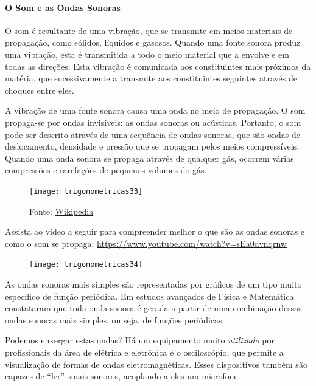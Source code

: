 \begin{knowledge}
\label{trig-knowledge1}
\vspace{-2\parskip}
\paragraph{O Som e as Ondas Sonoras}
O som é resultante de uma vibração, que se transmite em meios materiais de propagação, como sólidos, líquidos e gasosos.  Quando uma fonte sonora produz uma vibração, esta é transmitida a todo o meio material que a envolve e em todas as direções. Esta vibração é comunicada aos constituintes mais próximos da matéria, que sucessivamente a transmite aos constituintes seguintes através de choques entre eles.

A vibração de uma fonte sonora causa uma onda no meio de propagação. O som propaga-se por ondas invisíveis: as ondas sonoras ou acústicas. Portanto, o som pode ser descrito através de uma sequência de ondas sonoras, que são ondas de deslocamento, densidade e pressão que se propagam pelos meios compressíveis. Quando uma onda sonora se propaga através de qualquer gás, ocorrem várias compressões e rarefações de pequenos volumes do gás.

\begin{figure}[H]
\centering

\texttt{[image: trigonometricas33]}
\caption{Fonte: \href{https://pt.wikipedia.org/wiki/Som}{Wikipedia} }
\label{}
\end{figure}

Assista ao vídeo a seguir para compreender melhor o que são as ondas sonoras e como o som se propaga: \url{https://www.youtube.com/watch?v=sEa0dvnqrnw}

\begin{figure}[H]
\centering

\texttt{[image: trigonometricas34]}
\end{figure}

\needspace{5em}
As ondas sonoras mais simples são representadas por gráficos de um tipo muito específico de função periódica. Em estudos avançados de Física e Matemática constataram que toda onda sonora é gerada a partir de uma combinação dessas ondas sonoras mais simples, ou seja, de funções periódicas.

Podemos enxergar estas ondas? Há um equipamento muito \textit{utilizado} por profissionais da área de elétrica e eletrônica é o osciloscópio, que permite a visualização de formas de ondas eletromagnéticas. Esses dispositivos também são capazes de “ler”{} sinais sonoros, acoplando a eles um microfone.


\end{knowledge}
